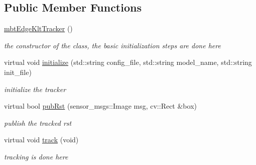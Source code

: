 \subsection*{\-Public \-Member \-Functions}
\begin{DoxyCompactItemize}
\item 
\hypertarget{classmbtEdgeKltTracker_ab26b9dd74f2dd65f194f219313413f22}{\hyperlink{classmbtEdgeKltTracker_ab26b9dd74f2dd65f194f219313413f22}{mbt\-Edge\-Klt\-Tracker} ()}\label{classmbtEdgeKltTracker_ab26b9dd74f2dd65f194f219313413f22}

\begin{DoxyCompactList}\small\item\em the constructor of the class, the basic initialization steps are done here \end{DoxyCompactList}\item 
\hypertarget{classmbtEdgeKltTracker_a3963a97622eb1b5c7b7c9b8293f419a8}{virtual void \hyperlink{classmbtEdgeKltTracker_a3963a97622eb1b5c7b7c9b8293f419a8}{initialize} (std\-::string config\-\_\-file, std\-::string model\-\_\-name, std\-::string init\-\_\-file)}\label{classmbtEdgeKltTracker_a3963a97622eb1b5c7b7c9b8293f419a8}

\begin{DoxyCompactList}\small\item\em initialize the tracker \end{DoxyCompactList}\item 
virtual bool \hyperlink{classmbtEdgeKltTracker_aa5f41d0aecdec85610e24a5e70db0c31}{pub\-Rst} (sensor\-\_\-msgs\-::\-Image msg, cv\-::\-Rect \&box)
\begin{DoxyCompactList}\small\item\em publish the tracked rst \end{DoxyCompactList}\item 
\hypertarget{classmbtEdgeKltTracker_a91bf02e888da5da55fe5c8ed83550a1a}{virtual void \hyperlink{classmbtEdgeKltTracker_a91bf02e888da5da55fe5c8ed83550a1a}{track} (void)}\label{classmbtEdgeKltTracker_a91bf02e888da5da55fe5c8ed83550a1a}

\begin{DoxyCompactList}\small\item\em tracking is done here \end{DoxyCompactList}\end{DoxyCompactItemize}


